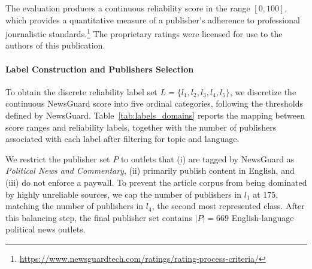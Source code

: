 \documentclass[journal]{IEEEtran}
\begin{document}
The evaluation produces a continuous reliability score in the range \([0,100]\), which provides a quantitative measure of a publisher’s adherence to professional journalistic standards.\footnote{\url{https://www.newsguardtech.com/ratings/rating-process-criteria/}}  
The proprietary ratings were licensed for use to the authors of this publication.

\paragraph{Label Construction and Publishers Selection}
\label{sec:labelConstruction}

To obtain the discrete reliability label set
\(L = \{l_1, l_2, l_3, l_4, l_5\}\),
we discretize the continuous NewsGuard score into five ordinal categories, following the thresholds defined by NewsGuard. 
Table~\ref{tab:labels_domains} reports the mapping between score ranges and reliability labels, together with the number of publishers associated with each label after filtering for topic and language.

\begin{table}[ht]
\centering
{}
\caption{Reliability label definition based on NewsGuard scores, including the number of domains after filtering for English-language political news outlets, the count of successfully scraped domains, and the total number of collected articles.}
\label{tab:labels_domains}
\end{table}


We restrict the publisher set \(P\) to outlets that (i) are tagged by NewsGuard as \emph{Political News and Commentary}, (ii) primarily publish content in English, and (iii)
do not enforce a paywall.
To prevent the article corpus from being dominated by highly unreliable sources, we cap the number of publishers in $l_1$ at 175, matching the number of publishers in $l_4$, the second most represented class.
After this balancing step, the final publisher set contains \(|P| = 669\) English-language political news outlets.
\end{document}
